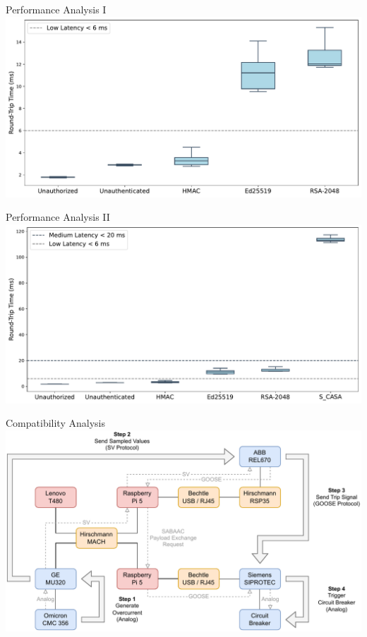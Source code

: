 \documentclass[en]{sdqbeamer}
\begin{document}
\begin{frame}{Performance Analysis I}
    \centering
    \includegraphics[height=0.75\textheight]{./figures/boxplot_without_casa.pdf}
\end{frame}
\begin{frame}{Performance Analysis II}
    \centering
    \includegraphics[height=0.75\textheight]{./figures/boxplot_with_casa.pdf}
\end{frame}
\begin{frame}{Compatibility Analysis}
    \centering
    \includegraphics[height=0.75\textheight]{./figures/lab_evaluation_steps.drawio.pdf}
\end{frame}
\end{document}
